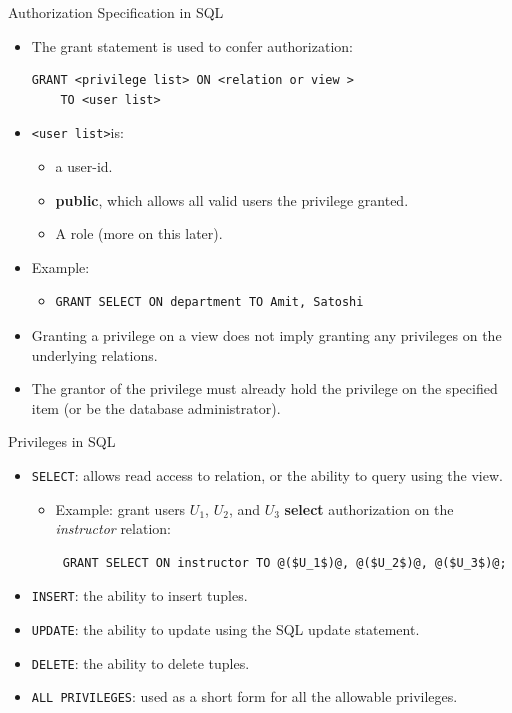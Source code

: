 \documentclass[aspectratio=169]{beamer}
\begin{document}
\begin{frame}[fragile]{Authorization Specification in SQL}
    \begin{itemize}
        \item The grant statement is used to confer authorization:
            \begin{verbatim}
GRANT <privilege list> ON <relation or view >
    TO <user list>
            \end{verbatim}
        \item \verb|<user list>|is:
            \begin{itemize}
                \item a user-id.
                \item \textbf{public}, which allows all valid users the privilege granted.
                \item A role (more on this later).
            \end{itemize}
        \item Example:
            \begin{itemize}
                \item
                \begin{verbatim}
GRANT SELECT ON department TO Amit, Satoshi
                \end{verbatim}
            \end{itemize}
        \item Granting a privilege on a view does not imply granting any privileges on the underlying relations.
        \item The grantor of the privilege must already hold the privilege on the specified item (or be the database administrator).
    \end{itemize}
\end{frame}

\begin{frame}[fragile]{Privileges in SQL}
    \begin{itemize}
        \item \texttt{SELECT}: allows read access to relation, or the ability to query using the view.
            \begin{itemize}
                \item Example: grant users $U_1$, $U_2$, and $U_3$ \textbf{select} authorization on the \textit{instructor} relation:
                    \begin{lstlisting}
 GRANT SELECT ON instructor TO @($U_1$)@, @($U_2$)@, @($U_3$)@;
                    \end{lstlisting}
            \end{itemize}
        \item \texttt{INSERT}: the ability to insert tuples.
        \item \texttt{UPDATE}: the ability to update using the SQL update statement.
        \item \texttt{DELETE}: the ability to delete tuples.
        \item \texttt{ALL PRIVILEGES}: used as a short form for all the allowable privileges.
    \end{itemize}
\end{frame}
\end{document}
